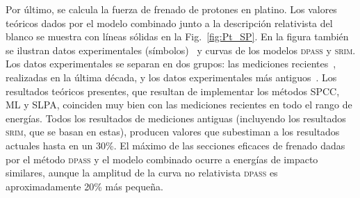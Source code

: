 Por último, se calcula la fuerza de frenado de protones en platino. 
Los valores teóricos dados por el modelo combinado junto a la 
descripción relativista del blanco se muestra con líneas sólidas en la 
Fig.~\ref{fig:Pt_SP}. En la figura también se ilustran datos 
experimentales (símbolos)~\cite{iaea,Primetzhofer:12,Goebl:13,
Celedon:15,Moro:20} y curvas de los modelos \textsc{dpass} y 
\textsc{srim}. Los datos experimentales se separan en dos grupos: las
mediciones recientes~\cite{Primetzhofer:12,Goebl:13,Celedon:15,Moro:20}, 
realizadas en la última década, y los datos experimentales más 
antiguos~\cite{iaea,Krist:83,Sirotinin:84,Ishiwari:74,Ishiwari:79,
Ogino:88,Sakamoto:91,Shiomi:94}. Los resultados 
teóricos presentes, que resultan de implementar los métodos SPCC, ML y 
SLPA, coinciden muy bien con las mediciones recientes en todo el rango 
de energías. Todos los resultados de mediciones antiguas (incluyendo los 
resultados \textsc{srim}, que se basan en estas), producen valores que 
subestiman a los resultados actuales hasta en un 30\%.
El máximo de las secciones eficaces de 
frenado dadas por el método \textsc{dpass} y el modelo combinado ocurre 
a energías de impacto similares, aunque la amplitud de la curva no 
relativista \textsc{dpass} es aproximadamente 20\% más pequeña. 



